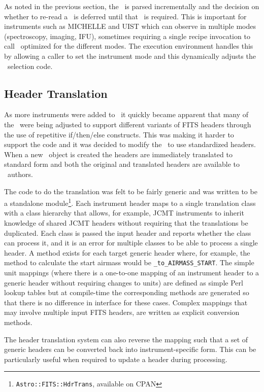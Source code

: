 \documentclass[final,authoryear,5p,times,twocolumn]{elsarticle}
\begin{document}
As noted in the previous section, the \recipe\ is parsed incrementally
and the decision on whether to re-read a \primitive\ is deferred until
that \primitive\ is required. This is important for instruments such
as MICHELLE and UIST which can observe in multiple modes
(spectroscopy, imaging, IFU), sometimes
requiring a single recipe invocation to call \primitives\ optimized
for the different modes. The execution environment handles this by
allowing a caller to set the instrument mode and this dynamically
adjusts the \primitive\ selection code.

\subsection{Header Translation}

As more instruments were added to \oracdr\ it quickly became apparent
that many of the \primitives\ were being adjusted to support different
variants of FITS headers through the use of repetitive if/then/else
constructs. This was making it harder to support the code and it was
decided to modify the \primitives\ to use standardized headers. When a
new \Frame\ object is created the headers are immediately translated
to standard form and both the original and translated headers are
available to \primitive\ authors.

The code to do the translation was felt to be fairly generic and was
written to be a standalone
module\footnote{\texttt{Astro::FITS::HdrTrans}, available on
  CPAN}. Each instrument header maps to a single translation class
with a class hierarchy that allows, for example, JCMT instruments to
inherit knowledge of shared JCMT headers without requiring that the
translations be duplicated. Each class is passed the input header and
reports whether the class can process it, and it is an error for multiple
classes to be able to process a single header. A method exists for each
target generic header where,
for example, the method to calculate the start airmass would be
\texttt{\_to\_AIRMASS\_START}. The simple unit mappings (where there
is a one-to-one mapping of an instrument header to a generic header
without requiring changes to units) are defined as simple Perl lookup tables
but at compile-time the corresponding methods are generated so that
there is no difference in interface for these cases. Complex mappings
that may involve multiple input FITS headers, are written as explicit
conversion methods.

The header translation system can also reverse the mapping such that a
set of generic headers can be converted back into instrument-specific
form. This can be particularly useful when required to update a header
during processing.
\end{document}

